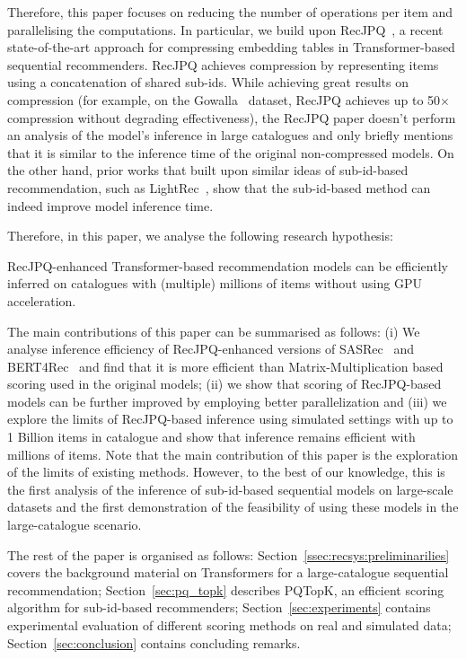 \documentclass[sigconf,natbib=true, review=true]{acmart} %
\begin{document}
Therefore, this paper focuses on reducing the number of operations per item and parallelising the computations. In particular, we build upon RecJPQ~\cite{petrovRecJPQTrainingLargeCatalogue2024}, a recent state-of-the-art approach for compressing embedding tables in Transformer-based sequential recommenders. RecJPQ achieves compression by representing items using a concatenation of shared sub-ids. While achieving great results on compression (for example, on the Gowalla~\cite{g} dataset, RecJPQ achieves up to 50$\times$ compression without degrading effectiveness), the RecJPQ paper doesn't perform an analysis of the model's inference in large catalogues and only briefly mentions that it is similar to the inference time of the original non-compressed models. On the other hand, prior works that built upon similar ideas of sub-id-based recommendation, such as LightRec~\cite{lianLightRecMemorySearchEfficient2020}, show that the sub-id-based method can indeed improve model inference time. 



Therefore, in this paper, we analyse the following research hypothesis:
\begin{tcolorbox}[enhanced, drop shadow, title={Hypothesis H1}]

\label{hyp:h0}
    RecJPQ-enhanced Transformer-based recommendation models can be efficiently inferred on catalogues with (multiple) millions of items without using GPU acceleration. 
\end{tcolorbox}

The main contributions of this paper can be summarised as follows: (i) We analyse inference efficiency of RecJPQ-enhanced versions of SASRec~\cite{SASRec} and BERT4Rec~\cite{BERT4Rec} and find that it is more efficient than Matrix-Multiplication based scoring used in the original models; (ii) we show that scoring of RecJPQ-based models can be further improved by employing better parallelization and (iii) we explore the limits of RecJPQ-based inference using simulated settings with up to 1 Billion items in catalogue and show that inference remains efficient with millions of items.
Note that the main contribution of this paper is the exploration of the limits of existing methods. However, to the best of our knowledge, this is the first analysis of the inference of sub-id-based sequential models on large-scale datasets and the first demonstration of the feasibility of using these models in the large-catalogue scenario. 

The rest of the paper is organised as follows: Section~\ref{ssec:recsys:preliminarilies} covers the background material on Transformers for a large-catalogue sequential recommendation; Section~\ref{sec:pq_topk} describes PQTopK, an efficient scoring algorithm for sub-id-based recommenders; Section~\ref{sec:experiments} contains experimental evaluation of different scoring methods on real and simulated data; Section~\ref{sec:conclusion} contains concluding remarks. 
\end{document}
